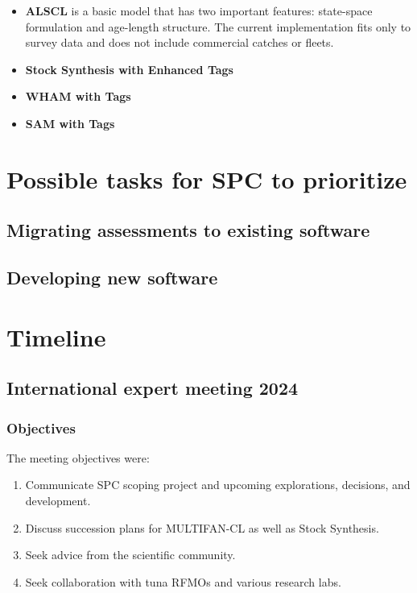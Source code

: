 \documentclass{SCreport}
\begin{document}
\begin{itemize}
  \item \textbf{ALSCL} is a basic model that has two important features:
  state-space formulation and age-length structure. The current implementation
  fits only to survey data and does not include commercial catches or fleets.
  \item \textbf{Stock Synthesis with Enhanced Tags}
  \item \textbf{WHAM with Tags}
  \item \textbf{SAM with Tags}
\end{itemize}

\section{Possible tasks for SPC to prioritize}

\subsection{Migrating assessments to existing software}

\subsection{Developing new software}

\section{Timeline}

\subsection{International expert meeting 2024}

\subsubsection{Objectives}

The meeting objectives were:

\begin{enumerate}
  \item Communicate SPC scoping project and upcoming explorations, decisions,
  and development.
  \item Discuss succession plans for MULTIFAN-CL as well as Stock Synthesis.
  \item Seek advice from the scientific community.
  \item Seek collaboration with tuna RFMOs and various research labs.
\end{enumerate}
\end{document}
